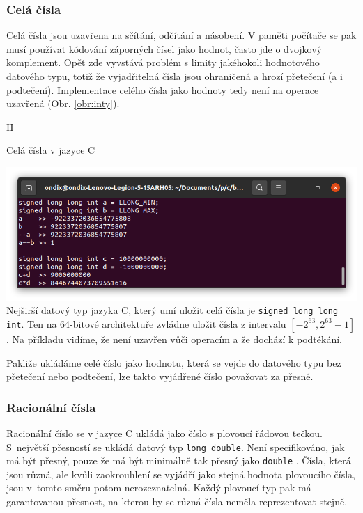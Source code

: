 \subsubsection{Celá čísla}
Celá čísla jsou uzavřena na sčítání, odčítání a násobení. V paměti počítače se pak musí používat kódování záporných čísel jako hodnot, často jde o dvojkový komplement. Opět zde vyvstává problém s limity jakéhokoli hodnotového datového typu, totiž že vyjadřitelná čísla jsou ohraničená a hrozí přetečení (a i podtečení). Implementace celého čísla jako hodnoty tedy není na operace uzavřená (Obr. \ref{obr:inty}).
\begin{myfigure}{H}
\caption{Celá čísla v jazyce C}
\includegraphics[width=\linewidth]{./graphics/inty.png}\label{obr:inty}
Nejširší datový typ jazyka C, který umí uložit celá čísla je \texttt{signed long long int}. Ten na 64-bitové architektuře zvládne uložit čísla z intervalu $[-2^{63}, 2^{63}-1]$. Na příkladu vidíme, že není uzavřen vůči operacím a že dochází k podtékání.
\end{myfigure}
Pakliže ukládáme celé číslo jako hodnotu, která se vejde do datového typu bez přetečení nebo podtečení, lze takto vyjádřené číslo považovat za přesné.

\subsubsection{Racionální čísla}
Racionální číslo se v jazyce C ukládá jako číslo s plovoucí řádovou tečkou. S~největší přesností se ukládá datový typ \texttt{long double}. Není specifikováno, jak má být přesný, pouze že má být minimálně tak přesný jako \texttt{double} \cite{wiki:LD}. Čísla, která jsou různá, ale kvůli zaokrouhlení se vyjádří jako stejná hodnota plovoucího čísla, jsou v~tomto směru potom nerozeznatelná. Každý plovoucí typ pak má garantovanou přesnost, na kterou by se různá čísla neměla reprezentovat stejně.

